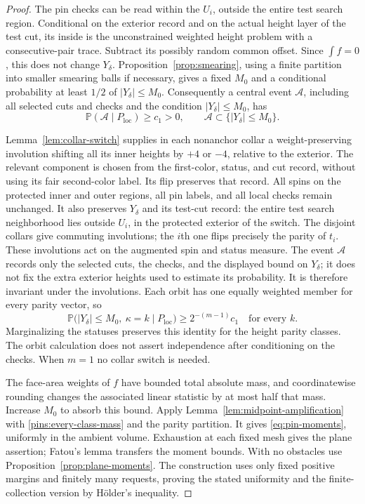 \documentclass[11pt]{article}
\newcommand{\Prob}{\mathbb P}
\theoremstyle{definition}
\theoremstyle{remark}
\numberwithin{equation}{section}
\begin{document}
\begin{proof}
The pin checks can be read within the $U_i$, outside the entire test
search region.  Conditional on the exterior record and on the actual
height layer of the test cut, its inside is the unconstrained weighted
height problem with a consecutive-pair trace.  Subtract its possibly
random common offset.  Since $\int f=0$, this does not change
$Y_\delta$.  Proposition~\ref{prop:smearing}, using a finite partition
into smaller smearing balls if necessary, gives a fixed $M_0$ and a
conditional probability at least $1/2$ of $|Y_\delta|\le M_0$.
Consequently a central event $\mathcal A$, including all selected cuts
and checks and the condition $|Y_\delta|\le M_0$, has
\begin{equation}\label{pins:central-unpartitioned}
 \Prob(\mathcal A\mid P_{\mathrm{loc}})\ge c_1>0,
 \qquad \mathcal A\subset\{|Y_\delta|\le M_0\}.
\end{equation}

Lemma~\ref{lem:collar-switch} supplies in each nonanchor collar a
weight-preserving involution shifting all its inner heights by $+4$
or $-4$, relative to the exterior.  The relevant component is chosen
from the first-color, status, and cut record, without using its fair
second-color label.  Its flip preserves that record.  All spins on
the protected inner and outer regions, all pin labels, and all local
checks remain unchanged.  It also preserves $Y_\delta$ and its test-cut
record: the entire test search neighborhood lies outside $U_i$, in the
protected exterior of the switch.  The disjoint collars give commuting involutions;
the $i$th one flips precisely the parity of $t_i$.  These involutions
act on the augmented spin and status measure.  The event $\mathcal A$
records only the selected cuts, the checks, and the displayed bound on
$Y_\delta$; it does not fix the extra exterior heights used to estimate
its probability.  It is therefore invariant under the involutions.
Each orbit has one equally weighted
member for every parity vector, so
\begin{equation}\label{pins:every-class-mass}
 \Prob\bigl(|Y_\delta|\le M_0,\ \kappa=k
                   \mid P_{\mathrm{loc}}\bigr)
 \ge 2^{-(m-1)}c_1\quad\text{for every }k.
\end{equation}
Marginalizing the statuses preserves this identity for the height
parity classes.  The orbit calculation does not assert independence
after conditioning on the checks.  When $m=1$ no collar switch is needed.

The face-area weights of $f$ have bounded total absolute mass, and
coordinatewise rounding changes the associated linear statistic by
at most half that mass.  Increase $M_0$ to absorb this bound.  Apply
Lemma~\ref{lem:midpoint-amplification} with
\eqref{pins:every-class-mass} and the parity partition.  It gives
\eqref{eq:pin-moments}, uniformly in the ambient volume.  Exhaustion
at each fixed mesh gives the plane assertion; Fatou's lemma transfers
the moment bounds.  With no obstacles use
Proposition~\ref{prop:plane-moments}.  The construction uses only fixed
positive margins and finitely many requests, proving the stated
uniformity and the finite-collection version by H\"older's inequality.
\end{proof}
\end{document}

